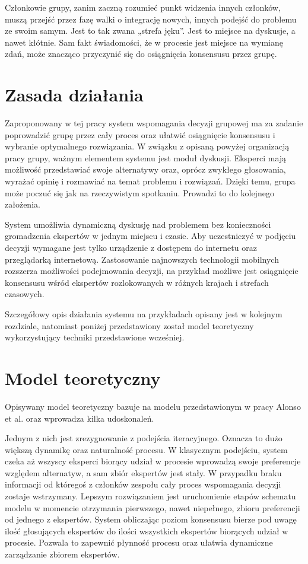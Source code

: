 Członkowie grupy, zanim zaczną rozumieć punkt widzenia innych członków, muszą 
przejść przez fazę walki o integrację nowych, innych podejść do problemu ze 
swoim samym. Jest to tak zwana „strefa jęku”. Jest to miejsce na dyskusje, a 
nawet kłótnie. Sam fakt świadomości, że w procesie jest miejsce na wymianę zdań, 
może znacząco przyczynić się do osiągnięcia konsensusu przez grupę.

\section{Zasada działania}
Zaproponowany w tej pracy system wspomagania decyzji grupowej ma za zadanie
poprowadzić grupę przez cały proces oraz ułatwić osiągnięcie konsensusu i
wybranie optymalnego rozwiązania. W związku z opisaną powyżej organizacją pracy
grupy, ważnym elementem systemu jest moduł dyskusji. Eksperci mają możliwość
przedstawiać swoje alternatywy oraz, oprócz zwykłego głosowania, wyrażać opinię
i rozmawiać na temat problemu i rozwiązań. Dzięki temu, grupa może poczuć się
jak na rzeczywistym spotkaniu. Prowadzi to do kolejnego założenia.

System umożliwia dynamiczną dyskusję nad problemem bez konieczności gromadzenia 
ekspertów w jednym miejscu i czasie. Aby uczestniczyć w podjęciu decyzji 
wymagane jest tylko urządzenie z dostępem do internetu oraz przeglądarką 
internetową. Zastosowanie najnowszych technologii mobilnych rozszerza możliwości
podejmowania decyzji, na przykład możliwe jest osiągnięcie konsensusu wśród 
ekspertów rozlokowanych w różnych krajach i strefach czasowych.

Szczegółowy opis działania systemu na przykładach opisany jest w kolejnym 
rozdziale, natomiast poniżej przedstawiony został model teoretyczny 
wykorzystujący techniki przedstawione wcześniej.

\section{Model teoretyczny}
Opisywany model teoretyczny bazuje na modelu przedstawionym w pracy Alonso et
al. \cite{Alonso2010} oraz wprowadza kilka udoskonaleń.

Jednym z nich jest zrezygnowanie z podejścia iteracyjnego. Oznacza to dużo
większą dynamikę oraz naturalność procesu. W klasycznym podejściu, system czeka
aż wszyscy eksperci biorący udział w procesie wprowadzą swoje preferencje
względem alternatyw, a sam zbiór ekspertów jest stały. W przypadku braku
informacji od któregoś z członków zespołu cały proces wspomagania decyzji
zostaje wstrzymany. 
Lepszym rozwiązaniem jest uruchomienie etapów schematu modelu w momencie
otrzymania pierwszego, nawet niepełnego, zbioru preferencji od jednego z
ekspertów. System obliczając poziom konsensusu bierze pod uwagę ilość
głosujących ekspertów do ilości wszystkich ekspertów biorących udział w
procesie. Pozwala to zapewnić płynność procesu oraz ułatwia dynamiczne
zarządzanie zbiorem ekspertów.

